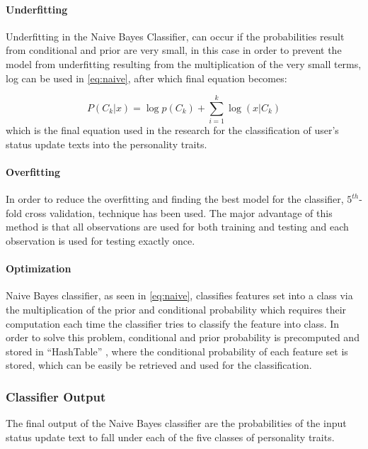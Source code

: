 \documentclass[journal]{IEEEtran}
\begin{document}
\paragraph{Underfitting}

Underfitting \cite{naive} in the Naive Bayes Classifier, can occur if the probabilities result from conditional and prior are very small, in this case in order to prevent the model from underfitting resulting from the multiplication of the very small terms, log can be used in \ref{eq:naive}, after which final equation becomes:

\begin{equation}
P(C_k|x) = \log p(C_k) + \sum_{i=1}^{k} \log(x|C_k)
\end{equation}
which is the final equation used in the research for the classification of user's status update texts into the personality traits.

\paragraph{Overfitting}

In order to reduce the overfitting and finding the best model for the classifier, $5^{th}$-fold cross validation, technique has been used. The major advantage of this method is that all observations are used for both training and testing and each observation is used for testing exactly once.

\paragraph{Optimization}

Naive Bayes classifier, as seen in \ref{eq:naive}, classifies features set into a class via the multiplication of the prior and conditional probability which requires their computation each time the classifier tries to classify the feature into class. In order to solve this problem, conditional and prior probability is precomputed and stored in ``HashTable'' \cite{naive}, where the conditional probability of each feature set is stored, which can be easily be retrieved and used for the classification.

\subsubsection{Classifier Output}
The final output of the Naive Bayes classifier are the probabilities of the input status update text to fall under each of the five classes of personality traits.
\end{document}
